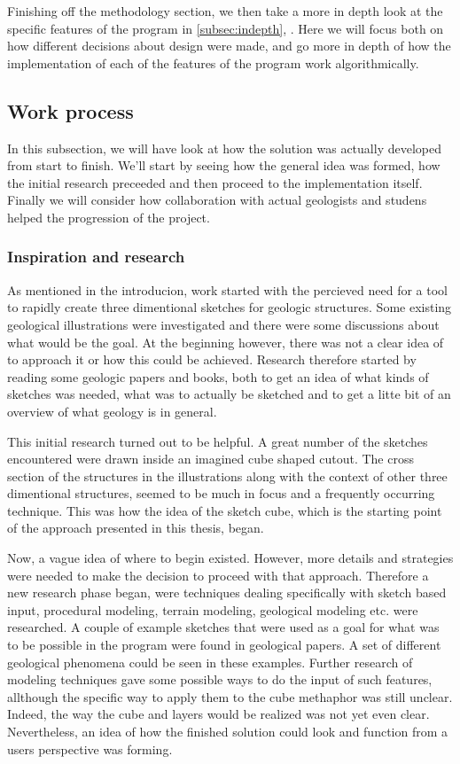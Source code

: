 \documentclass[a4paper,12pt]{article}
\newcommand{\secref}[1]{\autoref{#1}, \nameref{#1}}
\begin{document}
Finishing off the methodology section, we then take a more in depth look at the specific features of the program in \secref{subsec:indepth}. Here we will focus both on how different decisions about design were made, and go more in depth of how the implementation of each of the features of the program work algorithmically.

\subsection{Work process}

In this subsection, we will have look at how the solution was actually developed from start to finish. We'll start by seeing how the general idea was formed, how the initial research preceeded and then proceed to the implementation itself. Finally we will consider how collaboration with actual geologists and studens helped the progression of the project.
\label{subsec:work}
\subsubsection{Inspiration and research}
As mentioned in the introducion, work started with the percieved need for a tool to rapidly create three dimentional sketches for geologic structures. Some existing geological illustrations were investigated and there were some discussions about what would be the goal. At the beginning however, there was not a clear idea of to approach it or how this could be achieved. Research therefore started by reading some geologic papers and books, both to get an idea of what kinds of sketches was needed, what was to actually be sketched and to get a litte bit of an overview of what geology is in general.

This initial research turned out to be helpful. A great number of the sketches encountered were drawn inside an imagined cube shaped cutout. The cross section of the structures in the illustrations along with the context of other three dimentional structures, seemed to be much in focus and a frequently occurring technique. This was how the idea of the sketch cube, which is the starting point of the approach presented in this thesis, began.

Now, a vague idea of where to begin existed. However, more details and strategies were needed to make the decision to proceed with that approach. Therefore a new research phase began, were techniques dealing specifically with sketch based input, procedural modeling, terrain modeling, geological modeling etc. were researched. A couple of example sketches that were used as a goal for what was to be possible in the program were found in geological papers. A set of different geological phenomena could be seen in these examples. Further research of modeling techniques gave some possible ways to do the input of such features, allthough the specific way to apply them to the cube methaphor was still unclear. Indeed, the way the cube and layers would be realized was not yet even clear. Nevertheless, an idea of how the finished solution could look and function from a users perspective was forming.
\end{document}

